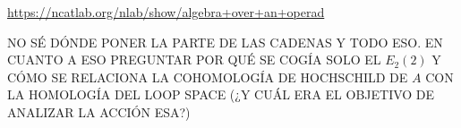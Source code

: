 \documentclass[TFM.tex]{subfiles}
\begin{document}
\url{https://ncatlab.org/nlab/show/algebra+over+an+operad}

NO SÉ DÓNDE PONER LA PARTE DE LAS CADENAS Y TODO ESO. EN CUANTO A ESO PREGUNTAR POR QUÉ SE COGÍA SOLO EL $E_2(2)$ Y CÓMO SE RELACIONA LA COHOMOLOGÍA DE HOCHSCHILD DE $A$ CON LA HOMOLOGÍA DEL LOOP SPACE (¿Y CUÁL ERA EL OBJETIVO DE ANALIZAR LA ACCIÓN ESA?)

%
\end{document}
